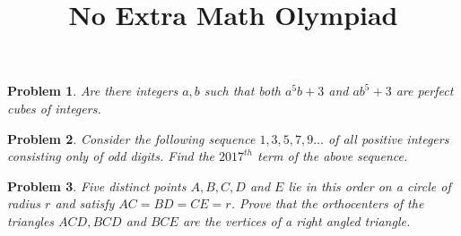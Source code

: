 \documentclass{article}
\title{\Huge{No Extra Math Olympiad}}
\newtheorem{problem}{Problem}
\begin{document}
	\Large
	\maketitle
	
	\begin{problem}
		Are there integers $ a, b $ such that both $ a^5b+3 $ and $ ab^5 +3 $ are perfect cubes of integers.
	\end{problem}

	\begin{problem}
		Consider the following sequence $ 1, 3, 5, 7, 9\dots $ of all positive integers consisting only of odd digits. Find the $ 2017^{th} $ term of the above sequence.
	\end{problem}

	\begin{problem}
		Five distinct points $ A, B, C, D $ and $ E $ lie in this order on a circle of radius $ r $ and satisfy $ AC=BD=CE=r $. Prove that the orthocenters of the triangles $ ACD, BCD $ and $ BCE $ are the vertices of a right angled triangle.
	\end{problem}
	
\end{document}
